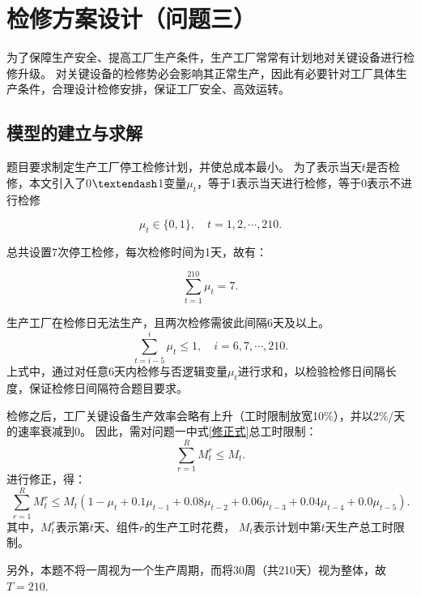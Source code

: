 \section{检修方案设计（问题三）} %
\label{sec:检修方案设计}

为了保障生产安全、提高工厂生产条件，生产工厂常常有计划地对关键设备进行检修升级。
对关键设备的检修势必会影响其正常生产，因此有必要针对工厂具体生产条件，合理设计检修安排，保证工厂安全、高效运转。

\subsection{模型的建立与求解} %
\label{sub:模型的建立与求解}

题目要求制定生产工厂停工检修计划，并使总成本最小。
为了表示当天$t$是否检修，本文引入了0$\textendash$1变量$\mu_t$，等于1表示当天进行检修，等于0表示不进行检修

\begin{equation}
	\mu_{t} \in\{0,1\},\quad t=1,2,\cdots,210.
\end{equation}

总共设置7次停工检修，每次检修时间为1天，故有：

\begin{equation}
	\sum_{t=1}^{210}\mu_t=7.
\end{equation}

生产工厂在检修日无法生产，且两次检修需彼此间隔6天及以上。
\begin{equation}
	\sum_{t=i-5}^{i} \mu_{t} \leqslant 1,\quad i=6,7, \cdots, 210.
\end{equation}
上式中，通过对任意6天内检修与否逻辑变量$\mu_t$进行求和，以检验检修日间隔长度，保证检修日间隔符合题目要求。

检修之后，工厂关键设备生产效率会略有上升（工时限制放宽10\%），并以2\%/天的速率衰减到0。
因此，需对问题一中式\ref{修正式}总工时限制：
\begin{equation}
	\sum_{r=1}^{R} M_{t}^{r} \leqslant M_{t}.
\end{equation}
进行修正，得：
\begin{equation}
	\sum_{r=1}^{R} M_{t}^{r} \leqslant M_{t}\left(1-\mu_{t}+0.1 \mu_{t-1}+0.08 \mu_{t-2}+0.06 \mu_{t-3}+0.04 \mu_{t-4}+0.0 \mu_{t-5}\right).
\end{equation}
其中，$M_{t}^{r}$表示第$t$天、组件$r$的生产工时花费，
$M_{t}$表示计划中第$t$天生产总工时限制。

另外，本题不将一周视为一个生产周期，而将30周（共210天）视为整体，故$T=210$.

